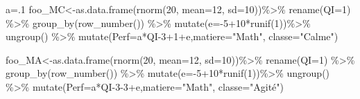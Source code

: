 \documentclass[
]{book}
\newenvironment{Shaded}{\begin{snugshade}}{\end{snugshade}}
\newcommand{\AttributeTok}[1]{\textcolor[rgb]{0.77,0.63,0.00}{#1}}
\newcommand{\DecValTok}[1]{\textcolor[rgb]{0.00,0.00,0.81}{#1}}
\newcommand{\FunctionTok}[1]{\textcolor[rgb]{0.00,0.00,0.00}{#1}}
\newcommand{\NormalTok}[1]{#1}
\newcommand{\OtherTok}[1]{\textcolor[rgb]{0.56,0.35,0.01}{#1}}
\newcommand{\SpecialCharTok}[1]{\textcolor[rgb]{0.00,0.00,0.00}{#1}}
\newcommand{\StringTok}[1]{\textcolor[rgb]{0.31,0.60,0.02}{#1}}
\begin{document}
\begin{Shaded}
\begin{Highlighting}[]
\NormalTok{a}\OtherTok{=}\NormalTok{.}\DecValTok{1}
\NormalTok{foo\_MC}\OtherTok{\textless{}{-}}\FunctionTok{as.data.frame}\NormalTok{(}\FunctionTok{rnorm}\NormalTok{(}\DecValTok{20}\NormalTok{, }\AttributeTok{mean=}\DecValTok{12}\NormalTok{, }\AttributeTok{sd=}\DecValTok{10}\NormalTok{))}\SpecialCharTok{\%\textgreater{}\%}
  \FunctionTok{rename}\NormalTok{(}\AttributeTok{QI=}\DecValTok{1}\NormalTok{) }\SpecialCharTok{\%\textgreater{}\%} \FunctionTok{group\_by}\NormalTok{(}\FunctionTok{row\_number}\NormalTok{()) }\SpecialCharTok{\%\textgreater{}\%} 
  \FunctionTok{mutate}\NormalTok{(}\AttributeTok{e=}\SpecialCharTok{{-}}\DecValTok{5}\SpecialCharTok{+}\DecValTok{10}\SpecialCharTok{*}\FunctionTok{runif}\NormalTok{(}\DecValTok{1}\NormalTok{))}\SpecialCharTok{\%\textgreater{}\%} \FunctionTok{ungroup}\NormalTok{() }\SpecialCharTok{\%\textgreater{}\%}
  \FunctionTok{mutate}\NormalTok{(}\AttributeTok{Perf=}\NormalTok{a}\SpecialCharTok{*}\NormalTok{QI}\DecValTok{{-}3}\SpecialCharTok{+}\DecValTok{1}\SpecialCharTok{+}\NormalTok{e,}\AttributeTok{matiere=}\StringTok{"Math"}\NormalTok{, }\AttributeTok{classe=}\StringTok{"Calme"}\NormalTok{)}

\NormalTok{foo\_MA}\OtherTok{\textless{}{-}}\FunctionTok{as.data.frame}\NormalTok{(}\FunctionTok{rnorm}\NormalTok{(}\DecValTok{20}\NormalTok{, }\AttributeTok{mean=}\DecValTok{12}\NormalTok{, }\AttributeTok{sd=}\DecValTok{10}\NormalTok{))}\SpecialCharTok{\%\textgreater{}\%}
  \FunctionTok{rename}\NormalTok{(}\AttributeTok{QI=}\DecValTok{1}\NormalTok{) }\SpecialCharTok{\%\textgreater{}\%} \FunctionTok{group\_by}\NormalTok{(}\FunctionTok{row\_number}\NormalTok{()) }\SpecialCharTok{\%\textgreater{}\%} 
  \FunctionTok{mutate}\NormalTok{(}\AttributeTok{e=}\SpecialCharTok{{-}}\DecValTok{5}\SpecialCharTok{+}\DecValTok{10}\SpecialCharTok{*}\FunctionTok{runif}\NormalTok{(}\DecValTok{1}\NormalTok{))}\SpecialCharTok{\%\textgreater{}\%} \FunctionTok{ungroup}\NormalTok{() }\SpecialCharTok{\%\textgreater{}\%}
  \FunctionTok{mutate}\NormalTok{(}\AttributeTok{Perf=}\NormalTok{a}\SpecialCharTok{*}\NormalTok{QI}\DecValTok{{-}3{-}3}\SpecialCharTok{+}\NormalTok{e,}\AttributeTok{matiere=}\StringTok{"Math"}\NormalTok{, }\AttributeTok{classe=}\StringTok{"Agité"}\NormalTok{)}


\end{Highlighting}
\end{Shaded}
\end{document}

